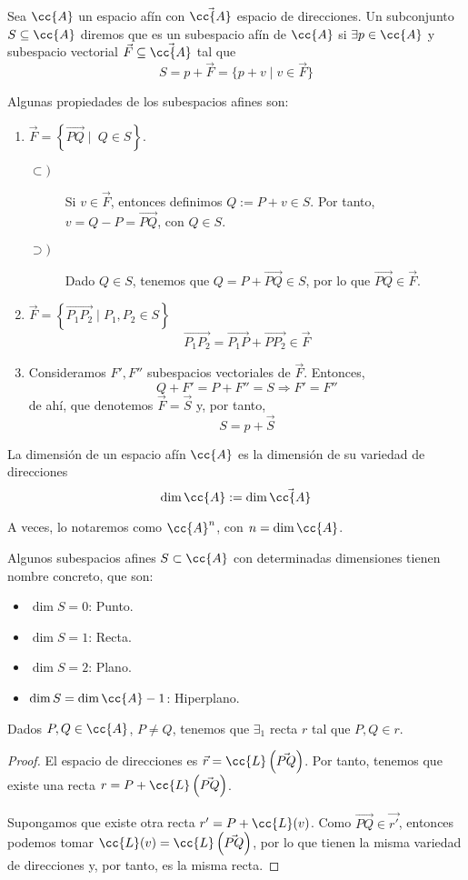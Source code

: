 \begin{definicion}
    Sea $\cc{A}$ un espacio afín con $\vec{\cc{A}}$ espacio de direcciones. Un subconjunto $S\subseteq \cc{A}$ diremos que es un subespacio afín de $\cc{A}$ si $\exists p\in \cc{A}$ y subespacio vectorial $\vec{F}\subseteq \vec{\cc{A}}$ tal que $$S=p+\vec{F}=\{p+v\mid v\in \vec{F}\}$$
\end{definicion}
Algunas propiedades de los subespacios afines son:
\begin{enumerate}
    \item $\vec{F}=\left\{\vec{PQ}\mid ~Q\in S\right\}$.
    \begin{description}
        \item[$\subset)$] Si $v\in \vec{F}$, entonces definimos $Q:=P+v\in S$. Por tanto, $v=Q-P=\vec{PQ}$, con $Q\in S$.

        \item[$\supset)$] Dado $Q\in S$, tenemos que $Q=P+\vec{PQ}\in S$, por lo que $\vec{PQ}\in \vec{F}$.
    \end{description}
    \item $\vec{F}=\left\{\vec{P_1P_2}\mid P_1,P_2\in S\right\}$
    $$\vec{P_1P_2} = \vec{P_1P} + \vec{PP_2}\in \vec{F}$$
    \item Consideramos $F', F''$ subespacios vectoriales de $\vec{F}$. Entonces,
    $$Q+F' = P+F'' = S \Longrightarrow F'=F''$$
    de ahí, que denotemos $\vec{F}=\vec{S}$ y, por tanto,
    $$S=p+\vec{S}$$
\end{enumerate}


\begin{definicion}
    La dimensión de un espacio afín $\cc{A}$ es la dimensión de su variedad de direcciones
    $$\dim \cc{A} :=\dim \vec{\cc{A}}$$
    
    A veces, lo notaremos como $\cc{A}^n$, con $n=\dim \cc{A}$.
\end{definicion}

Algunos subespacios afines $S\subset \cc{A}$ con determinadas dimensiones tienen nombre concreto, que son:
\begin{itemize}
    \item $\dim S=0$: Punto.
    \item $\dim S=1$: Recta.
    \item $\dim S=2$: Plano.
    \item $\dim S=\dim \cc{A}-1$: Hiperplano.
\end{itemize}

\begin{prop}
    Dados $P,Q\in \cc{A}$, $P\neq Q$, tenemos que $\exists_1$ recta $r$ tal que $P,Q\in r$.
\end{prop}
\begin{proof}
    El espacio de direcciones es $\vec{r}=\cc{L}\left(\vec{PQ}\right)$. Por tanto, tenemos que existe una recta $r=P+\cc{L}\left(\vec{PQ}\right)$.

    Supongamos que existe otra recta $r'=P+\cc{L}(v)$. Como $\vec{PQ}\in \vec{r'}$, entonces podemos tomar $\cc{L}(v)=\cc{L}\left(\vec{PQ}\right)$, por lo que tienen la misma variedad de direcciones y, por tanto, es la misma recta.
\end{proof}


